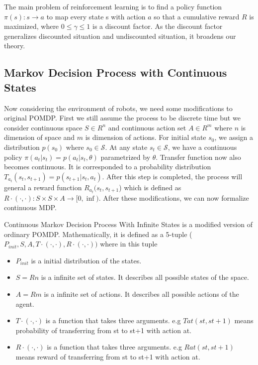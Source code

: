\documentclass[officiallayout]{tktla}
\begin{document}
The main problem of reinforcement learning is to find a policy function $\pi(s) : s \rightarrow a$ to map every state s with action $a$ so that a cumulative reward $R$ is maximized, where $0 \leq \gamma \leq 1$ is a discount factor. As the discount factor generalizes discounted situation and undiscounted situation, it broadens our theory.

\subsection{Markov Decision Process with Continuous States}
Now considering the environment of robots, we need some modifications to original POMDP. First we still assume the process to be discrete time but we consider continuous space $S \in R^n$ and continuous action set $A \in R^m$ where $n$ is dimension of space and $m$ is dimension of actions. For initial state $s_0$, we assign a distribution $p(s_0)$ where $s_0 \in \mathcal{S}$. At any state $s_t \in \mathcal{S}$, we have a continuous policy $\pi(a_t|s_t) = p(a_t|s_t,\theta)$ parametrized by $\theta$. Transfer function now also becomes continuous. It is corresponded to a probability distribution $T_{a_t}(s_t,s_{t+1}) = p(s_{t+1}|s_t,a_t)$. After this step is completed, the process will general a reward function $R_{a_t}(s_t,s_{t+1}$) which is defined as $R\cdot(\cdot,\cdot) : S  \times S \times A \rightarrow [0,\inf)$.
After these modifications, we can now formalize continuous MDP.

Continuous Markov Decision Process With Infinite States is a modified version of ordinary POMDP. Mathematically, it is defined as a 5-tuple ($P_{init},S,A,T\cdot(\cdot,\cdot),R\cdot(\cdot,\cdot))$ where in this tuple
\begin{itemize}
\item	$P_{init}$ is a initial distribution of the states.
\item	$S = Rn$ is a infinite set of states. It describes all possible states of the space.
\item	$A = Rm$ is a infinite set of actions. It describes all possible actions of the agent.
\item	$T\cdot(\cdot,\cdot)$ is a function that takes three arguments. e.g $Tat(st,st+1)$ means probability of transferring from st to st+1 with action at.
\item	$R\cdot(\cdot,\cdot)$ is a function that takes three arguments. e.g $Rat(st,st+1)$ means reward of transferring from st to st+1 with action at.
\end{itemize}
\end{document}
